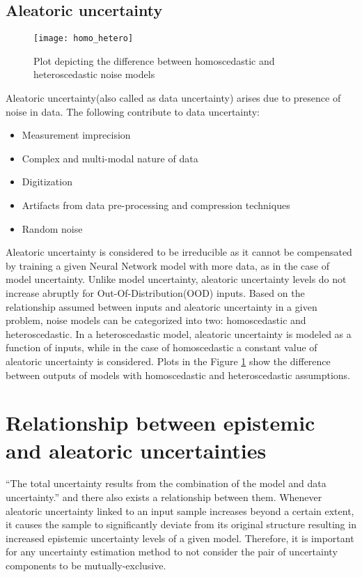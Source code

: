 	\subsection{Aleatoric uncertainty}
		 \begin{figure}[H]
		\centering
		\texttt{[image: homo\_hetero]}
		\caption[Homoscedastic and heteroscedastic model outputs]{Plot depicting the difference between homoscedastic and heteroscedastic noise models}
		\label{fig_homo_hetero}
	\end{figure}
	Aleatoric uncertainty(also called as data uncertainty) arises due to presence of noise in data. The following contribute to data uncertainty:
	\begin{itemize}
	\item Measurement imprecision
	\item Complex and multi-modal nature of data
	\item Digitization
	\item Artifacts from data pre-processing and compression techniques
	\item Random noise
	\end{itemize}
 	Aleatoric uncertainty is considered to be irreducible as it cannot be compensated by training a given Neural Network model with more data, as in the case of model uncertainty.
 	Unlike model uncertainty, aleatoric uncertainty levels do not increase abruptly for Out-Of-Distribution(OOD) inputs. Based on the relationship assumed between inputs and aleatoric uncertainty in a given problem, noise models can be categorized into two: homoscedastic and heteroscedastic. In a heteroscedastic model, aleatoric uncertainty is modeled as a function of inputs, while in the case of homoscedastic a constant value of aleatoric uncertainty is considered. Plots in the Figure \ref{fig_homo_hetero} show the difference between outputs of models with homoscedastic and heteroscedastic assumptions.

	\section{Relationship between epistemic and aleatoric uncertainties}
	 	\enquote{The total uncertainty results from the combination of the model and data uncertainty.}\cite{loquercio2020a} and there also exists a relationship between them. Whenever aleatoric uncertainty linked to an input sample increases beyond a certain extent, it causes the sample to significantly deviate from its original structure resulting in increased epistemic uncertainty levels of a given model. Therefore, it is important for any uncertainty estimation method to not consider the pair of uncertainty components to be mutually-exclusive. 
	 